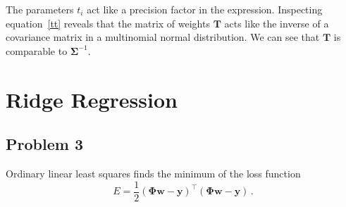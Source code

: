 \documentclass{scrartcl}
\begin{document}
The parameters $t_i$ act like a precision factor in the expression. Inspecting equation~\ref{tt} reveals that the matrix of weights $\mathbf{T}$ acts like the inverse of a covariance matrix in a multinomial normal distribution. We can see that $\mathbf{T}$ is comparable to $\mathbf{\Sigma}^{-1}$.

\section{Ridge Regression}
\subsection{Problem 3}
Ordinary linear least squares finds the minimum of the loss function
\begin{equation}
	E = \frac{1}{2} \left(\mathbf{\Phi}\mathbf{w} - \mathbf{y}\right)^\top \left(\mathbf{\Phi}\mathbf{w} - \mathbf{y}\right) \, .
\end{equation}
\end{document}
